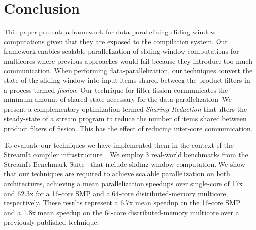 \section{Conclusion}


This paper presents a framework for data-parallelizing sliding window
computations given that they are exposed to the compilation system.  Our
framework enables scalable parallelization of sliding window
computations for multicores where previous approaches would fail
because they introduce too much communication.  When performing
data-parallelization, our techniques convert the state of the sliding
window into input items shared between the product filters in a
process termed {\it fission}.  Our technique for filter fission
communicates the minimum amount of shared state necessary for the
data-parallelization.  We present a complementary optimization termed
{\it Sharing Reduction} that alters the steady-state of a stream
program to reduce the number of items shared between product filters
of fission.  This has the effect of reducing inter-core communication.

To evaluate our techniques we have implemented them in the context of
the StreamIt compiler infrastructure~\cite{gordon-asplos06}.  We
employ 3 real-world benchmarks from the StreamIt Benchmark
Suite~\cite{streamit-suite} that include sliding window computation.
We show that our techniques are required to achieve scalable
parallelization on both architectures, achieving a mean
parallelization speedups over single-core of 17x and 62.3x for a
16-core SMP and a 64-core distributed-memory multicore, respectively.
These results represent a 6.7x mean speedup on the 16-core SMP and a
1.8x mean speedup on the 64-core distributed-memory multicore over a
previously published technique.


